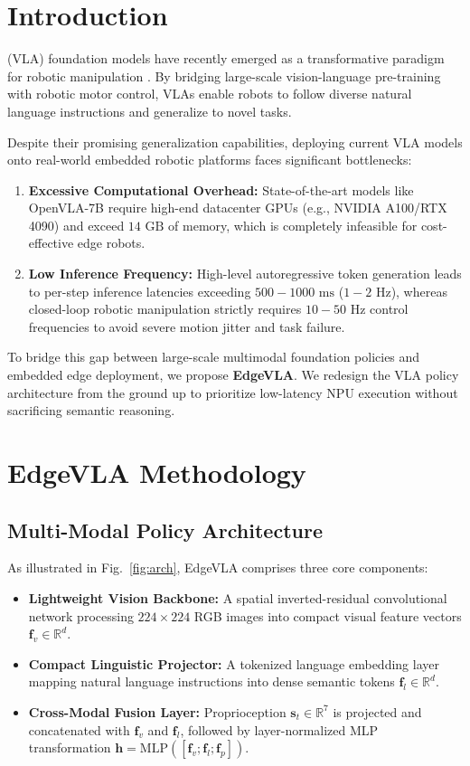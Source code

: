 \documentclass[lettersize,journal]{IEEEtran}
\begin{document}
\section{Introduction}
 (VLA) foundation models have recently emerged as a transformative paradigm for robotic manipulation \cite{brohan2023rt2, kim2024openvla, octo_2023}. By bridging large-scale vision-language pre-training with robotic motor control, VLAs enable robots to follow diverse natural language instructions and generalize to novel tasks.

Despite their promising generalization capabilities, deploying current VLA models onto real-world embedded robotic platforms faces significant bottlenecks:
\begin{enumerate}
    \item \textbf{Excessive Computational Overhead:} State-of-the-art models like OpenVLA-7B \cite{kim2024openvla} require high-end datacenter GPUs (e.g., NVIDIA A100/RTX 4090) and exceed $14\text{ GB}$ of memory, which is completely infeasible for cost-effective edge robots.
    \item \textbf{Low Inference Frequency:} High-level autoregressive token generation leads to per-step inference latencies exceeding $500-1000\text{ ms}$ ($1-2\text{ Hz}$), whereas closed-loop robotic manipulation strictly requires $10-50\text{ Hz}$ control frequencies to avoid severe motion jitter and task failure.
\end{enumerate}

To bridge this gap between large-scale multimodal foundation policies and embedded edge deployment, we propose \textbf{EdgeVLA}. We redesign the VLA policy architecture from the ground up to prioritize low-latency NPU execution without sacrificing semantic reasoning.

\section{EdgeVLA Methodology}

\subsection{Multi-Modal Policy Architecture}
As illustrated in Fig.~\ref{fig:arch}, EdgeVLA comprises three core components:
\begin{itemize}
    \item \textbf{Lightweight Vision Backbone:} A spatial inverted-residual convolutional network processing $224 \times 224$ RGB images into compact visual feature vectors $\mathbf{f}_v \in \mathbb{R}^{d}$.
    \item \textbf{Compact Linguistic Projector:} A tokenized language embedding layer mapping natural language instructions into dense semantic tokens $\mathbf{f}_l \in \mathbb{R}^{d}$.
    \item \textbf{Cross-Modal Fusion Layer:} Proprioception $\mathbf{s}_t \in \mathbb{R}^{7}$ is projected and concatenated with $\mathbf{f}_v$ and $\mathbf{f}_l$, followed by layer-normalized MLP transformation $\mathbf{h} = \text{MLP}([\mathbf{f}_v; \mathbf{f}_l; \mathbf{f}_p])$.
\end{itemize}
\end{document}
